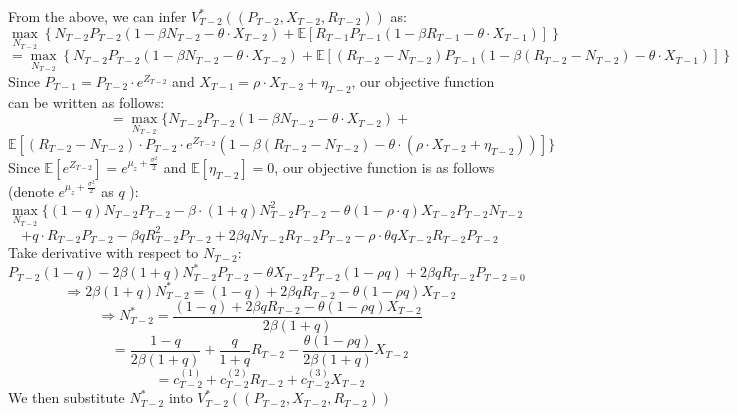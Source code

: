 \documentclass{article}
\begin{document}
From the above, we can infer $V_{T-2}^{*}\left(\left(P_{T-2}, X_{T-2}, R_{T-2}\right)\right)$ as:
$$
\max _{N_{T-2}} \left\{N_{T-2}P_{T-2}\left(1-\beta N_{T-2} - 
\theta \cdot X_{T-2}\right)+\mathbb{E}\left[R_{T-1}P_{T-1}\left(1-\beta R_{T-1} - 
\theta \cdot X_{T-1}\right)\right]\right\}
$$
$$
=\max _{N_{T-2}} \left\{N_{T-2}P_{T-2}\left(1-\beta N_{T-2} - 
\theta \cdot X_{T-2}\right)+\mathbb{E}\left[( R_{T-2}-N_{T-2} ) P_{T-1}\left(1-\beta ( R_{T-2}-N_{T-2} )  - 
\theta \cdot X_{T-1}\right)\right]\right\}
$$
Since $P_{T-1}=P_{T-2} \cdot e^{Z_{T-2}} $ and $X_{T-1}=\rho \cdot X_{T-2}+\eta_{T-2}$, our objective function can be written as follows:
$$
=\max _{N_{T-2}} \{N_{T-2}P_{T-2}\left(1-\beta N_{T-2} - 
\theta \cdot X_{T-2}\right)+$$
$$\mathbb{E}\left[( R_{T-2}-N_{T-2} ) \cdot P_{T-2} \cdot e^{Z_{T-2}}\left(1-\beta ( R_{T-2}-N_{T-2} ) - \theta \cdot (\rho \cdot X_{T-2}+\eta_{T-2})\right)\right]\}
$$
Since $\mathbb{E}[e^{Z_{T-2}}] = e^{\mu_z + \frac{\sigma^2}{2}}$ and $\mathbb{E}[
\eta_{T-2}] = 0$, our objective function is as follows (denote $e^{\mu_z + \frac{\sigma^2}{2}}$ as $q$ ):\\
$$\max_{N_{T-2}}\{(1-q)N_{T-2}P_{T-2}-\beta \cdot (1+q)N_{T-2}^2 P_{T-2} -\theta(1-\rho \cdot q)X_{T-2}P_{T-2}N_{T-2}$$  $$+  q \cdot R_{T-2} P_{T-2}-\beta q R_{T-2}^2P_{T-2} + 2\beta q N_{T-2}R_{T-2} P_{T-2} -\rho \cdot  \theta q X_{T-2}R_{T-2}P_{T-2}$$
Take derivative with respect to $N_{T-2}$:\\
$$ P_{T-2}(1-q)-2\beta(1+q)N_{T-2}^{*}P_{T-2}-\theta X_{T-2}P_{T-2}(1-\rho q) + 2 \beta q R_{T-2}P_{T-2 = 0}$$
$$\Rightarrow 2\beta (1+q)N_{T-2}^{*} = (1-q)+2\beta q R_{T-2} -\theta (1-\rho q)X_{T-2}$$
$$ \Rightarrow N_{T-2}^{*} =\frac{(1-q)+2\beta q R_{T-2} -\theta (1-\rho q)X_{T-2}}{2\beta (1+q)} $$
$$  = \frac{1-q}{2\beta(1+q)} + \frac{q}{1+q}R_{T-2} - \frac{\theta (1-\rho q)}{2\beta (1+q)} X_{T-2}$$
$$  = c^{(1)}_{T-2} + c^{(2)}_{T-2}R_{T-2} +c^{(3)}_{T-2}X_{T-2}$$
We then substitute $N^{*}_{T-2}$ into $V_{T-2}^{*}((P_{T-2},X_{T-2}, R_{T-2}))$
\end{document}
